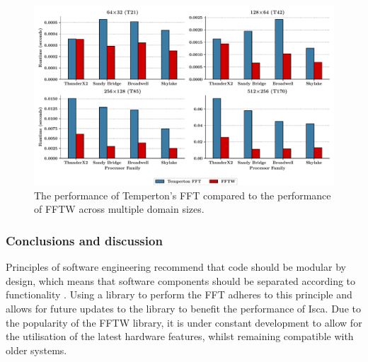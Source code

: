 \documentclass[a4paper,11pt]{report}
\begin{document}
\begin{figure}[H]
    \centering
    \includegraphics[width=1\textwidth]{img/compare_fft.pdf}
    \caption[Performance comparison of FFTW and Temperton's FFT]{The performance of Temperton's FFT compared to the performance of FFTW across multiple domain sizes.  }
    \label{fig:fft-times}
\end{figure}

\subsubsection{Conclusions and discussion}
Principles of software engineering recommend that code should be modular by design, which means that software components should be separated according to functionality \cite{parnas1972criteria}. Using a library to perform the FFT adheres to this principle and allows for future updates to the library to benefit the performance of Isca. Due to the popularity of the FFTW library, it is under constant development to allow for the utilisation of the latest hardware features, whilst remaining compatible with older systems. 
\par


%
%
%
\end{document}

